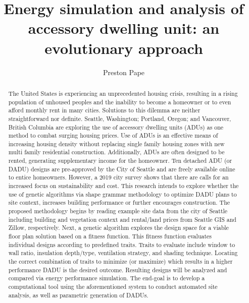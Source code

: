 \documentclass[sagev,times,Review]{sagej}
\begin{document}

\title{Energy simulation and analysis of accessory dwelling unit: 
an evolutionary approach}

\author{Preston Pape}




\begin{abstract}
The United States is experiencing an unprecedented housing crisis, resulting in a rising population of unhoused peoples and the inability to become a homeowner or to even afford monthly rent in many cities. Solutions to this dilemma are neither straightforward nor definite. Seattle, Washington; Portland, Oregon; and Vancouver, British Columbia are exploring the use of accessory dwelling units (ADUs) as one method to combat surging housing prices. Use of ADUs is an effective means of increasing housing density without replacing single family housing zones with new multi family residential construction. Additionally, ADUs are often designed to be rented, generating supplementary income for the homeowner. Ten detached ADU (or DADU) designs are pre-approved by the City of Seattle and are freely available online to entice homeowners. However, a 2019 city survey shows that there are calls for an increased focus on sustainability and cost. This research intends to explore whether the use of genetic algorithms via shape grammar methodology to optimize DADU plans to site context, increases building performance or further encourages construction. The proposed methodology begins by reading example site data from the city of Seattle including building and vegetation context and rental/land prices from Seattle GIS and Zillow, respectively. Next, a genetic algorithm explores the design space for a viable floor plan solution based on a fitness function. This fitness function evaluates individual designs according to predefined traits. Traits to evaluate include window to wall ratio, insulation depth/type, ventilation strategy, and shading technique. Locating the correct combination of traits to minimize (or maximize) which results in a higher performance DADU is the desired outcome. Resulting designs will be analyzed and compared via energy performance simulation. The end-goal is to develop a computational tool using the aforementioned system to conduct automated site analysis, as well as parametric generation of DADUs.\end{abstract}
\end{document}
